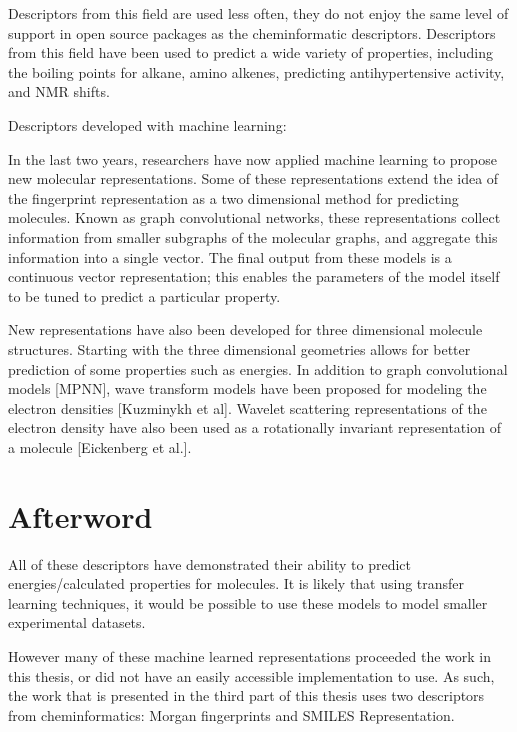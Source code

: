 Descriptors from this field are used less often, they do not enjoy the same level of support in open source packages as the cheminformatic descriptors. Descriptors from this field have been used to predict a wide variety of properties, including the boiling points for alkane, amino alkenes, predicting antihypertensive activity, and NMR shifts. 

Descriptors developed with machine learning:

In the last two years, researchers have now applied machine learning to propose new molecular representations. Some of these representations extend the idea of the fingerprint representation as a two dimensional method for predicting molecules. Known as graph convolutional networks, these representations collect information from smaller subgraphs of the molecular graphs, and aggregate this information into a single vector. The final output from these models is a continuous vector representation; this enables the parameters of the model itself to be tuned to predict a particular property.

New representations have also been developed for three dimensional molecule structures.  Starting with the three dimensional geometries allows for better prediction of some properties such as energies. In addition to graph convolutional models [MPNN], wave transform models have been proposed for modeling the electron densities [Kuzminykh et al]. Wavelet scattering representations of the electron density have also been used as a rotationally invariant representation of a molecule [Eickenberg et al.].

\section{Afterword}

All of these descriptors have demonstrated their ability to predict energies/calculated properties for molecules. It is likely that using transfer learning techniques, it would be possible to use these models to model smaller experimental datasets. 

However many of these machine learned representations proceeded the work in this thesis, or did not have an easily accessible implementation to use. As such, the work that is presented in the third part of this thesis uses two descriptors from cheminformatics: Morgan fingerprints and SMILES Representation.

